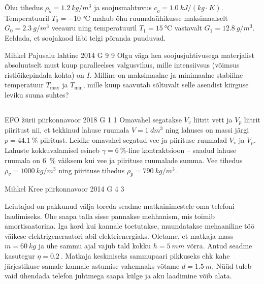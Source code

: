 \documentclass[11pt]{article}
\begin{document}
{{Õhu tihedus $\rho_{\tilde{o}}=\SI{1.2}{kg/m^{3}}$ ja soojusmahtuvus
$c_{\tilde{o}}=\SI{1.0}{kJ/\left(kg\cdot K\right)}$. Temperatuuril
$T_{0}=\SI{-10}{\celsius}$ mahub õhu ruumalaühikusse maksimaalselt
$G_{0}=\SI{2.3}{g/m^{3}}$ veeauru ning temperatuuril $T_{1}=\SI{15}{\celsius}$
vastavalt $G_{1}=\SI{12.8}{g/m^{3}}.$ Eeldada, et soojakaod läbi
telgi põranda puuduvad.
\fi
}

{Mihkel Pajusalu} %
{lahtine} %
{2014} %
{G 9} %
{9} %
{
\ifStatement
Olgu väga hea soojusjuhtivusega materjalist absoluutselt must kuup paralleelses valgusvihus, mille intensiivsus (võimsus ristlõikepindala kohta) on $I$. Milline on maksimaalne ja minimaalne stabiilne temperatuur $T_\text{max}$ ja $T_\text{min}$, mille kuup saavutab sõltuvalt selle asendist kiirguse leviku suuna suhtes?
\fi
}
\newpage\subsection{\protect{}}

{EFO žürii} %
{piirkonnavoor} %
{2018} %
{G 1} %
{1} %
{
\ifStatement
Omavahel segatakse $V_v$ liitrit vett ja $V_p$ liitrit piiritust nii, et tekkinud lahuse ruumala $V=\SI{1}{dm^3}$ ning lahuses on massi järgi $p=\SI{44,1}{\percent}$ piiritust. Leidke omavahel segatud vee ja piirituse ruumalad $V_v$ ja $V_p$. Lahuste kokkuvalamisel esineb $\gamma = \SI{6}{\percent}$-line kontraktsioon -- saadud lahuse ruumala on \SI{6}{\percent} väiksem kui vee ja piirituse ruumalade summa. Vee tihedus $\rho_v=\SI{1000}{kg/m^3}$ ning piirituse tihedus $\rho_p=\SI{790}{kg/m^3}$.
\fi
}

{Mihkel Kree} %
{piirkonnavoor} %
{2014} %
{G 4} %
{3} %
{
\ifStatement
Leiutajad on pakkunud välja toreda seadme matkainimestele oma telefoni laadimiseks. Ühe saapa talla sisse pannakse mehhanism, mis toimib amortisaatorina. Iga kord kui kannale toetutakse, muundatakse mehaaniline töö väikese elektrigeneraatori abil elektrienergiaks. Oletame, et matkaja mass $m=\SI{60}{kg}$ ja ühe sammu ajal vajub tald kokku 
$h=\SI{5}{mm}$ võrra. Antud seadme kasutegur $\eta = \SI{0,2}{}$. Matkaja keskmiseks sammupaari pikkuseks ehk kahe järjestikuse samale kannale astumise vahemaaks võtame $d=\SI{1.5}{m}$. Nüüd tuleb vaid ühendada telefon juhtmega saapa külge ja aku laadimine võib alata.

}}
\end{document}
